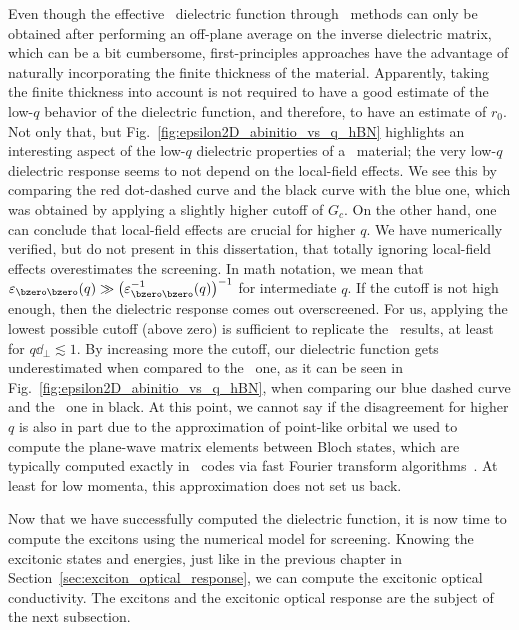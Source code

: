 Even though the effective \bd~dielectric function through \abinit~methods can only be obtained after performing an off-plane average on the inverse dielectric matrix, which can be a bit cumbersome, first-principles approaches have the advantage of naturally incorporating the finite thickness of the material.
Apparently, taking the finite thickness into account is not required to have a good estimate of the low-$q$ behavior of the dielectric function, and therefore, to have an estimate of $r_0$.
Not only that, but Fig.~\ref{fig:epsilon2D_abinitio_vs_q_hBN} highlights an interesting aspect of the low-$q$ dielectric properties of a \bd~material; the very low-$q$ dielectric response seems to not depend on the local-field effects.
We see this by comparing the red dot-dashed curve and the black curve with the blue one, which was obtained by applying a slightly higher cutoff of $G_c$.
On the other hand, one can conclude that local-field effects are crucial for higher $q$.
We have numerically verified, but do not present in this dissertation, that totally ignoring local-field effects overestimates the screening.
In math notation, we mean that $\varepsilon_{\bzero \bzero} (q) \gg \big(\varepsilon^{-1}_{\bzero \bzero} (q)\big)^{-1}$ for intermediate $q$.
If the cutoff is not high enough, then the dielectric response comes out overscreened.
For us, applying the lowest possible cutoff (above zero) is sufficient to replicate the \abinit~results, at least for $q \dd_{\perp}  \lesssim 1$.
By increasing more the cutoff, our dielectric function gets underestimated when compared to the \abinit~one, as it can be seen in Fig.~\ref{fig:epsilon2D_abinitio_vs_q_hBN}, when comparing our blue dashed curve and the \abinit~one in black.
At this point, we cannot say if the disagreement for higher $q$ is also in part due to the approximation of point-like orbital we used to compute the plane-wave matrix elements between Bloch states, which are typically computed exactly in \abinit~codes via fast Fourier transform algorithms~\cite{BerkeleyGW}.
At least for low momenta, this approximation does not set us back.

Now that we have successfully computed the dielectric function, it is now time to compute the excitons using the numerical model for screening.
Knowing the excitonic states and energies, just like in the previous chapter in Section~\ref{sec:exciton_optical_response}, we can compute the excitonic optical conductivity.
The excitons and the excitonic optical response are the subject of the next subsection.

